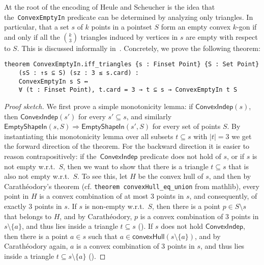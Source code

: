 At the root  of the encoding of Heule and Scheucher is the idea that
the~\lstinline|ConvexEmptyIn| predicate can be determined by analyzing only triangles.
In particular, that a set $s$ of $k$ points in a pointset $S$ form an empty convex $k$-gon
if and only if all the ${k \choose 3}$ triangles induced by vertices in $s$
are empty with respect to $S$.
This is discussed informally in~\cite[Section 3, Eq.~4]{emptyHexagonNumber}.
Concretely, we prove the following theorem:
\begin{lstlisting}
theorem ConvexEmptyIn.iff_triangles {s : Finset Point} {S : Set Point}
    (sS : ↑s ⊆ S) (sz : 3 ≤ s.card) :
    ConvexEmptyIn s S ↔
    ∀ (t : Finset Point), t.card = 3 → t ⊆ s → ConvexEmptyIn t S
\end{lstlisting}

\begin{proof}[Proof sketch]
    We first prove a simple monotonicity lemma: if $\textsf{ConvexIndep}(s)$, then $\textsf{ConvexIndep}(s')$ for every $s' \subseteq s$, and similarly $\textsf{EmptyShapeIn}(s, S) \Rightarrow \textsf{EmptyShapeIn}(s', S)$ for every set of points $S$.
    By instantiating this monotonicity lemma over all subsets $t \subseteq s$ with $|t| = 3$ we get the forward direction of the theorem.
    For the backward direction it is easier to reason contrapositively: if the~$\textsf{ConvexIndep}$ predicate does not hold of $s$, or if $s$ is not empty w.r.t.~$S$, then we want to show that there is a triangle $t \subseteq s$ that is also not empty w.r.t.~$S$. To see this, let $H$ be the convex hull of $s$, and then by Carath\'eodory's theorem (cf. \lstinline|theorem convexHull_eq_union| from \textsf{mathlib}), every point in $H$ is a convex combination of at most $3$ points in $s$, and consequently, of exactly $3$ points in $s$.
    If $s$ is non-empty w.r.t.~$S$, then there is a point $p \in S \setminus s$ that belongs to $H$, and by Carath\'eodory, $p$ is a convex combination of $3$ points in $s \setminus \{a\}$, and thus lies inside a triangle $t \subseteq s$ (). If $s$ does not hold $\textsf{ConvexIndep}$, then there is a point $a \in s$ such that $a \in \textsf{convexHull}(s \setminus \{a\})$, and by Carath\'eodory again, $a$ is a convex combination of $3$ points in $s$, and thus lies inside a triangle $t \subseteq s \setminus \{a\}$ ().

\end{proof}
